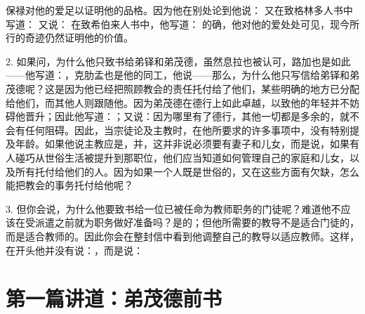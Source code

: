 保禄对他的爱足以证明他的品格。因为他在别处论到他说： 又在致格林多人书中写道： 又说： 在致希伯来人书中，他写道： 的确，他对他的爱处处可见，现今所行的奇迹仍然证明他的价值。\par

2. 如果问，为什么他只致书给弟铎和弟茂德，虽然息拉也被认可，路加也是如此——他写道：，克肋孟也是他的同工，他说——那么，为什么他只写信给弟铎和弟茂德呢？这是因为他已经把照顾教会的责任托付给了他们，某些明确的地方已分配给他们，而其他人则跟随他。因为弟茂德在德行上如此卓越，以致他的年轻并不妨碍他晋升；因此他写道：；又说：因为哪里有了德行，其他一切都是多余的，就不会有任何阻碍。因此，当宗徒论及主教时，在他所要求的许多事项中，没有特别提及年龄。如果他说主教应是，并，这并非说必须要有妻子和儿女，而是说，如果有人碰巧从世俗生活被提升到那职位，他们应当知道如何管理自己的家庭和儿女，以及所有托付给他们的人。因为如果一个人既是世俗的，又在这些方面有欠缺，怎么能把教会的事务托付给他呢？\par

3. 但你会说，为什么他要致书给一位已被任命为教师职务的门徒呢？难道他不应该在受派遣之前就为职务做好准备吗？是的；但他所需要的教导不是适合门徒的，而是适合教师的。因此你会在整封信中看到他调整自己的教导以适应教师。这样，在开头他并没有说：，而是说：\par



\section{第一篇讲道：弟茂德前书}

